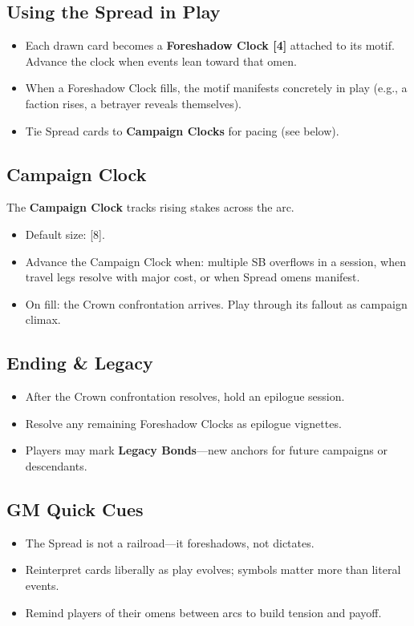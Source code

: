 \subsection{Using the Spread in Play}
\begin{itemize}
  \item Each drawn card becomes a \textbf{Foreshadow Clock [4]} attached to its motif. Advance the clock when events lean toward that omen.
  \item When a Foreshadow Clock fills, the motif manifests concretely in play (e.g., a faction rises, a betrayer reveals themselves).
  \item Tie Spread cards to \textbf{Campaign Clocks} for pacing (see below).
\end{itemize}

\subsection{Campaign Clock}
The \textbf{Campaign Clock} tracks rising stakes across the arc.
\begin{itemize}
  \item Default size: [8].
  \item Advance the Campaign Clock when: multiple SB overflows in a session, when travel legs resolve with major cost, or when Spread omens manifest.
  \item On fill: the Crown confrontation arrives. Play through its fallout as campaign climax.
\end{itemize}

\subsection{Ending \& Legacy}
\begin{itemize}
  \item After the Crown confrontation resolves, hold an epilogue session.
  \item Resolve any remaining Foreshadow Clocks as epilogue vignettes.
  \item Players may mark \textbf{Legacy Bonds}—new anchors for future campaigns or descendants.
\end{itemize}

\subsection{GM Quick Cues}
\begin{itemize}
  \item The Spread is not a railroad—it foreshadows, not dictates.
  \item Reinterpret cards liberally as play evolves; symbols matter more than literal events.
  \item Remind players of their omens between arcs to build tension and payoff.
\end{itemize}
